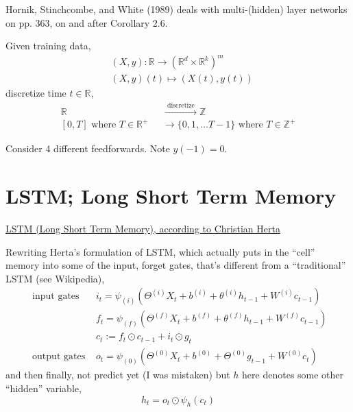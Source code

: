 \documentclass[10pt]{amsart}
\begin{document}
\begin{multicols*}{2}
Hornik, Stinchcombe, and White (1989) \cite{HSW1989} deals with multi-(hidden) layer networks on pp. 363, on and after Corollary 2.6.

Given training data,
\begin{equation}
  \begin{aligned}
    & (X,y) : \mathbb{R} \to (\mathbb{R}^d \times \mathbb{R}^k)^m \\ 
    & (X,y)(t) \mapsto (X(t),y(t))
    \end{aligned}
\end{equation}
discretize time $t\in \mathbb{R}$,
\begin{equation}
  \begin{aligned}
    \mathbb{R} &  \xrightarrow{ \text{ discretize }} \mathbb{Z} \\
 [0,T]\text{ where $T \in \mathbb{R}^+$ } & \to \lbrace 0 , 1, \dots T-1 \rbrace \text{ where } T\in \mathbb{Z}^+
    \end{aligned}
  \end{equation}

Consider 4 different feedforwards.  Note $y(-1)=0$.

\section{LSTM; Long Short Term Memory}

\href{http://www.christianherta.de/lehre/dataScience/machineLearning/neuralNetworks/LSTM.php}{LSTM (Long Short Term Memory), according to Christian Herta}

Rewriting Herta's formulation of LSTM, which actually puts in the ``cell'' memory into some of the input, forget gates, that's different from a ``traditional'' LSTM (see Wikipedia),
\begin{equation}
  \begin{aligned}
    \text{ input gates } & i_t = \psi_{(i)}(\Theta^{(i)}X_t + b^{(i)} + \theta^{(i)}h_{t-1} + W^{(i)}c_{t-1}) \\
        & f_t = \psi_{(f)}  (\Theta^{(f)} X_t + b^{(f)} + \theta^{(f)} h_{t-1} + W^{(f)} c_{t-1} )  \\
    & c_t := f_t \odot c_{t-1} + i_t \odot g_t \\
  \text{ output gates }   & o_t = \psi_{(0)} ( \Theta^{(0)} X_t + b^{(0)} + \Theta^{(0)} g_{t-1} + W^{(0)} c_t)
    \end{aligned}
  \end{equation}
and then finally, not predict yet (I was mistaken) but $h$ here denotes some other ``hidden'' variable,
\begin{equation}
  h_t = o_t\odot \psi_h(c_t)
\end{equation}



\end{multicols*}
\end{document}
